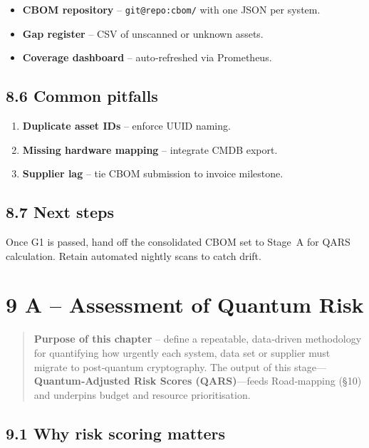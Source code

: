 \documentclass[
  english,
]{article}
\providecommand{\tightlist}{%
  \setlength{\itemsep}{0pt}\setlength{\parskip}{0pt}}
\begin{document}
\begin{itemize}
\tightlist
\item
  \textbf{CBOM repository} -- \texttt{git@repo:cbom/} with one JSON per
  system.
\item
  \textbf{Gap register} -- CSV of unscanned or unknown assets.
\item
  \textbf{Coverage dashboard} -- auto‑refreshed via Prometheus.
\end{itemize}

\subsection{8.6 Common pitfalls}\label{common-pitfalls}

\begin{enumerate}
\def\labelenumi{\arabic{enumi}.}
\tightlist
\item
  \textbf{Duplicate asset IDs} -- enforce UUID naming.
\item
  \textbf{Missing hardware mapping} -- integrate CMDB export.
\item
  \textbf{Supplier lag} -- tie CBOM submission to invoice milestone.
\end{enumerate}

\subsection{8.7 Next steps}\label{next-steps}

Once G1 is passed, hand off the consolidated CBOM set to Stage~A for
QARS calculation. Retain automated nightly scans to catch drift.

\section{9 A -- Assessment of Quantum
Risk}\label{a-assessment-of-quantum-risk-1}

\begin{quote}
\textbf{Purpose of this chapter} -- define a repeatable, data‑driven
methodology for quantifying how urgently each system, data set or
supplier must migrate to post‑quantum cryptography. The output of this
stage---\textbf{Quantum‑Adjusted Risk Scores (QARS)}---feeds
Road‑mapping (§10) and underpins budget and resource prioritisation.
\end{quote}

\subsection{9.1 Why risk scoring
matters}\label{why-risk-scoring-matters}
\end{document}
